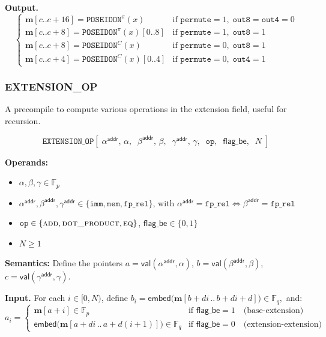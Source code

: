 \documentclass{article}
\theoremstyle{definition}
\newcommand{\Fp}{\mathbb F_p}
\newcommand{\Fq}{\mathbb F_q}
\newcommand{\extdeg}{d} %
\begin{document}
\textbf{Output.}
\[
\begin{cases}
\textbf{m}[c .. c + 16] = \texttt{POSEIDON}^\pi(x) & \text{if } \texttt{permute} = 1,\; \texttt{out8} = \texttt{out4} = 0 \\[1mm]
\textbf{m}[c .. c + 8] = \texttt{POSEIDON}^\pi(x)[0..8] & \text{if } \texttt{permute} = 1,\; \texttt{out8} = 1 \\[1mm]
\textbf{m}[c .. c + 8] = \texttt{POSEIDON}^C(x) & \text{if } \texttt{permute} = 0,\; \texttt{out8} = 1 \\[1mm]
\textbf{m}[c .. c + 4] = \texttt{POSEIDON}^C(x)[0..4] & \text{if } \texttt{permute} = 0,\; \texttt{out4} = 1
\end{cases}
\]

\subsubsection{EXTENSION\_OP}\label{extension_op_instruction}

A precompile to compute various operations in the extension field, useful for recursion.


\[
\texttt{EXTENSION\_OP}[\;\alpha^\textsf{addr},\, \alpha,\;\; \beta^\textsf{addr},\, \beta,\;\; \gamma^\textsf{addr},\, \gamma,\;\; \texttt{op},\;\; \textsf{flag\_be},\;\; N\;]
\]


\textbf{Operands:}
\begin{itemize}
    \item $\alpha, \beta, \gamma \in \Fp$
    \item $\alpha^\textsf{addr}, \beta^\textsf{addr}, \gamma^\textsf{addr} \in \{\texttt{imm}, \texttt{mem}, \texttt{fp\_rel}\}$, with $\alpha^\textsf{addr} = \texttt{fp\_rel} \Leftrightarrow \beta^\textsf{addr} = \texttt{fp\_rel}$
    \item $\texttt{op} \in \{\textsc{add}, \textsc{dot\_product}, \textsc{eq}\}$, $\textsf{flag\_be} \in \{0, 1\}$
    \item $N \geq 1$
\end{itemize}

\textbf{Semantics:} Define the pointers $a = \mathsf{val}(\alpha^\textsf{addr}, \alpha)$, $b = \mathsf{val}(\beta^\textsf{addr}, \beta)$, $c = \mathsf{val}(\gamma^\textsf{addr}, \gamma)$.

\textbf{Input.} For each $i \in [0, N)$, define
$
b_i = \mathsf{embed}\big(\textbf{m}[b + \extdeg i \,..\, b + \extdeg i + \extdeg]\big) \in \Fq,
$
and:
\[
a_i =
\begin{cases}
\textbf{m}[a + i] \in \Fp & \text{if } \textsf{flag\_be} = 1 \quad \text{(base-extension)} \\[1mm]
\mathsf{embed}\big(\textbf{m}[a + \extdeg i \,..\, a + \extdeg(i + 1)]\big) \in \Fq & \text{if } \textsf{flag\_be} = 0 \quad \text{(extension-extension)}
\end{cases}
\]
\end{document}
